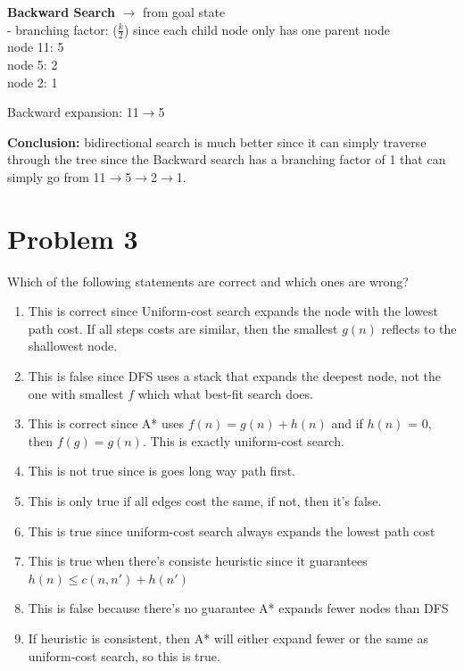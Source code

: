 \documentclass{article}
\begin{document}
\medskip

\textbf{Backward Search} $\rightarrow$ from goal state\\
- branching factor: ($\frac{k}{2}$) since each child node only has one parent node \\ 
node 11: 5\\
node 5: 2\\
node 2: 1 \\

\begin{center}
   Backward expansion: 11$\rightarrow$5
\end{center}

\textbf{Conclusion:} bidirectional search is much better since it can simply traverse through the tree since the 
Backward search has a branching factor of 1 that can simply go from 11$\rightarrow$5$\rightarrow$2$\rightarrow$1. 



\section*{Problem 3}
Which of the following statements are correct and which ones are wrong? 
\begin{enumerate}
   \item[(a)] This is correct since Uniform-cost search expands the node with the lowest path cost. If all steps costs are similar, then the smallest $g(n)$ reflects to the shallowest node.
   \item[(b)] This is false since DFS uses a stack that expands the deepest node, not the one with smallest $f$ which what best-fit search does.
   \item[(c)] This is correct since A* uses $f(n) = g(n) + h(n)$ and if $h(n)$ = 0, then $f(g) = g(n)$. This is exactly uniform-cost search.
   \item[(d)] This is not true since is goes long way path first. 
   \item[(e)] This is only true if all edges cost the same, if not, then it's false. 
   \item[(f)] This is true since uniform-cost search always expands the lowest path cost
   \item[(g)] This is true when there's consiste heuristic since it guarantees $h(n) \leq c(n, n') + h(n')$
   \item[(h)] This is false because there's no guarantee A* expands fewer nodes than DFS
   \item[(i)] If heuristic is consistent, then A* will either expand fewer or the same as uniform-cost search, so this is true. 
\end{enumerate}
\end{document}
